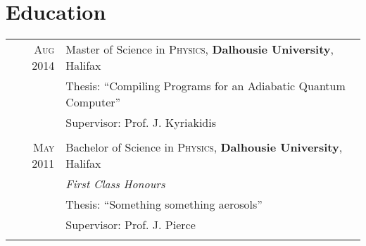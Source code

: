 \documentclass[a4paper,12pt]{article} %
\begin{document}

\section{Education}

\begin{tabular}{rl}	

\textsc{Aug} 2014 & Master of Science in \textsc{Physics}, \textbf{Dalhousie University}, Halifax \\
& Thesis: ``Compiling Programs for an Adiabatic Quantum Computer'' \\
& \small Supervisor: Prof. J. Kyriakidis \\
& \\

\textsc{May} 2011 & Bachelor of Science in \textsc{Physics}, \textbf{Dalhousie University}, Halifax \\
& \emph{First Class Honours}  \\
& Thesis: ``Something something aerosols''\\
& \small Supervisor: Prof. J. Pierce \\
& \\





\end{tabular}
\end{document}
